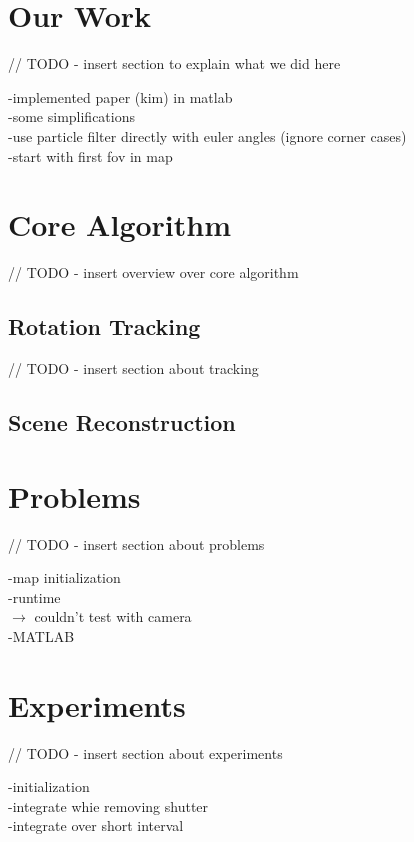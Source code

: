 \documentclass[10pt,twocolumn,letterpaper]{article}
\begin{document}


\section{Our Work}

// TODO - insert section to explain what we did here

-implemented paper (kim) in matlab\\
-some simplifications\\
	-use particle filter directly with euler angles (ignore corner cases)\\
	-start with first fov in map\\
	
\section{Core Algorithm}

// TODO - insert overview over core algorithm

\subsection{Rotation Tracking}

// TODO - insert section about tracking

\subsection{Scene Reconstruction}



\section{Problems}

// TODO - insert section about problems

-map initialization\\
-runtime\\
$\rightarrow$ couldn't test with camera\\
-MATLAB\\


\section{Experiments}

// TODO - insert section about experiments

-initialization\\
	-integrate whie removing shutter\\
	-integrate over short interval\\
	
\end{document}
